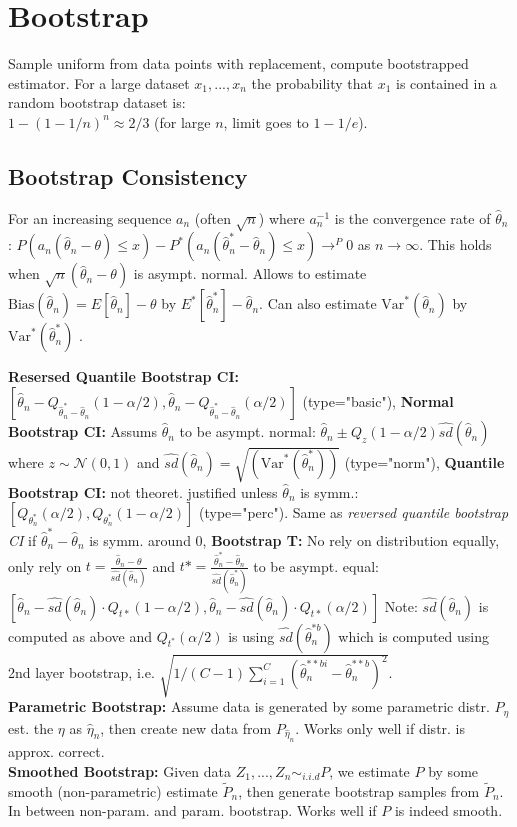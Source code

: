 \section*{Bootstrap}
Sample uniform from data points with replacement, compute bootstrapped estimator. For a large dataset $x_1, ..., x_n$ the probability that $x_1$ is contained in a random bootstrap dataset is: \\
$1-(1-1/n)^n \approx 2/3$ (for large $n$, limit goes to $1-1/e$).
\subsection*{Bootstrap Consistency}
For an increasing sequence $a_n$ (often $\sqrt{n}$) where $a_n^{-1}$ is the convergence rate of $\hat \theta_n$:
$P(a_n(\hat \theta_n - \theta) \leq x) - P^*(a_n(\hat \theta_n^* - \hat \theta_n) \leq x) \to^P 0$ as $n\to \infty$. This holds when $\sqrt{n}(\hat \theta_n - \theta)$ is asympt. normal. Allows to estimate $\text{Bias}(\hat \theta_n) = E[\hat \theta_n] - \theta$ by $E^*[\hat \theta^*_n] - \hat \theta_n$. Can also estimate $\text{Var}^*(\hat\theta_n)$ by $\text{Var}^*(\hat\theta^*_n)$ .

\textbf{Resersed Quantile Bootstrap CI:} $[\hat \theta_n - Q_{\hat{ \theta}_n^* - \hat \theta_n}(1- \alpha / 2), \hat \theta_n - Q_{\hat {\theta}_n^* - \hat \theta_n}(\alpha / 2)]$ (type="basic"), \textbf{Normal Bootstrap CI:} Assums $\hat\theta_n$ to be asympt. normal: $\hat\theta_n \pm Q_z(1-\alpha / 2)\hat{sd}(\hat\theta_n)$ where $z \sim \mathcal{N}(0,1)$ and $\hat{sd}(\hat\theta_n)=\sqrt{({\text{Var}^*(\hat\theta_n^*)})}$ (type="norm"), \textbf{Quantile Bootstrap CI:} not theoret. justified unless $\hat\theta_n$ is symm.:
$[Q_{\theta_n^*}(\alpha / 2), Q_{\theta_n^*}(1-\alpha / 2)]$ (type="perc"). Same as \textit{reversed quantile bootstrap CI} if $\hat\theta_n^* - \hat\theta_n$ is symm. around 0, \textbf{Bootstrap T:} No rely on distribution equally, only rely on $t=\frac{\hat\theta_n -\theta}{\hat {sd}(\hat\theta_n)}$ and $t*=\frac{\hat\theta_n^*-\hat\theta_n}{\hat{sd}(\hat\theta_n^*)}$ to be asympt. equal: $[\hat\theta_n - \hat{sd}(\hat\theta_n) \cdot Q_{t*}(1-\alpha / 2), \hat\theta_n - \hat{sd}(\hat\theta_n) \cdot Q_{t*}(\alpha / 2)]$ Note: $\hat{sd}(\hat\theta_n)$ is computed as above and $Q_{t^*}(\alpha/2)$ is using $\hat{sd}(\hat\theta^{*b}_n)$ which is computed using 2nd layer bootstrap, i.e. $\sqrt{1/(C-1)\sum_{i=1}^C{(\hat{\theta}_n^{**bi}-\hat{\theta}_n^{**b})^2}}$.
\\
\textbf{Parametric Bootstrap:}
Assume data is generated by some parametric distr. $P_{\eta}$ est. the $\eta$ as $\hat{\eta}_n$, then create new data from $P_{\hat{\eta}_n}$. Works only well if distr. is approx. correct.\\
\textbf{Smoothed Bootstrap:}
Given data $Z_1,...,Z_n \sim_{i.i.d} P$, we estimate $P$ by some smooth (non-parametric) estimate $\tilde P_n$, then generate bootstrap samples from $\tilde P_n$. In between non-param. and param. bootstrap. Works well if $P$ is indeed smooth.

